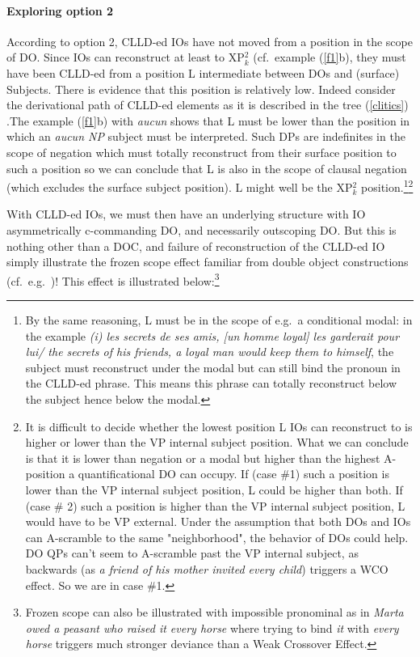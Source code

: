 \documentclass[output=paper]{langsci/langscibook}
\begin{document}
\paragraph*{Exploring option 2} According to option 2, \gls{CLLD}-ed \glspl{IO}
have not moved from a position in the scope of DO. Since \glspl{IO} can
reconstruct at least to XP$_k^2$  (cf.\ example (\ref{f1}b), they must have been
\gls{CLLD}-ed from a position L intermediate between \glspl{DO} and (surface)
Subjects. There is evidence that this position is relatively low. Indeed
consider the derivational path of \gls{CLLD}-ed elements as it is described in
the tree (\ref{clitics}) .The example (\ref{f1}b) with {\it aucun} shows that L must
be lower than the position in which an {\it aucun NP} subject must be
interpreted. Such DPs are indefinites in the scope of negation which must
totally reconstruct from their surface position to such a position so we can
conclude that L is also in the scope of clausal negation (which excludes the
surface subject position). L might well be the XP$_k^2$ position.\footnote{By
the same reasoning, L must be in the scope of e.g.\ a conditional modal: in the
example {\it (i)  les secrets de ses amis, [un homme
loyal] les garderait pour lui/ the secrets of his friends, a
loyal man would keep them to himself}, the subject must reconstruct under the
modal but can still bind the pronoun in the  CLLD-ed  phrase. This means this
phrase can totally reconstruct below the subject hence below the
modal.}\multiplefootnoteseparator\footnote{It is difficult to decide whether the lowest position L
\glspl{IO} can reconstruct to is higher or lower than the VP internal subject
position. What we can conclude is that it is lower than negation or a modal but
higher than the highest A-position a quantificational DO can occupy. If (case
\#1) such a position is lower than the VP internal subject position, L could be
higher than both.  If (case \# 2) such a position is higher  than the VP
internal subject position, L would have to be VP external.  Under the
assumption that both \glspl{DO} and \glspl{IO} can A-scramble to the same
"neighborhood", the behavior of \glspl{DO} could help. DO QPs can't seem to
A-scramble past the VP internal subject, as backwards   (as {\it a
friend of his mother invited every child}) triggers
a \gls{WCO} effect. So we are in case \#1.}

With \gls{CLLD}-ed \glspl{IO}, we must then have an underlying structure with
IO asymmetrically c-commanding DO, and necessarily outscoping DO. But this is
nothing other than a DOC, and failure of reconstruction of the \gls{CLLD}-ed IO
simply illustrate the frozen scope effect familiar from  double
object constructions (cf.\ e.g.\ \citealt{Larson:1988})! This effect is illustrated
below:\footnote{Frozen scope can also be illustrated with  impossible
    pronominal  as in {\it Marta owed a peasant who raised it every
    horse} where trying to bind {\it it} with {\it every  horse} triggers much
stronger deviance than a Weak Crossover Effect.}
\end{document}
